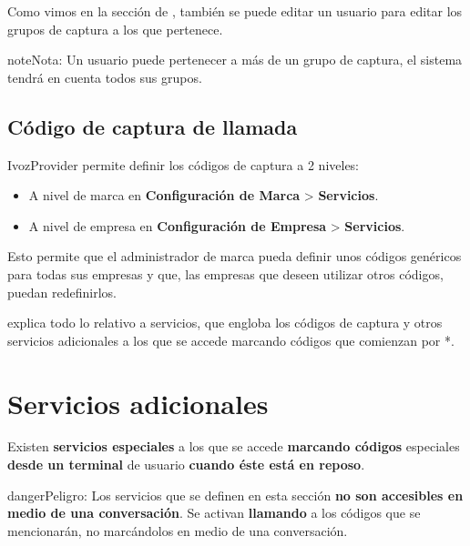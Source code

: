 \documentclass[letterpaper,10pt,spanish]{sphinxmanual}
\begin{document}
\noindent{}

Como vimos en la sección de {\hyperref[pbx_features/users:users]{}}, también se puede editar un usuario para editar los grupos de captura a los que pertenece.

\begin{notice}{note}{Nota:}
Un usuario puede pertenecer a más de un grupo de captura, el sistema tendrá en cuenta todos sus grupos.
\end{notice}


\subsection{Código de captura de llamada}
\label{pbx_features/call_captures:group-pickup-service-code}
IvozProvider permite definir los códigos de captura a 2 niveles:
\begin{itemize}
\item {} 
A nivel de marca en \textbf{Configuración de Marca} \textgreater{} \textbf{Servicios}.

\item {} 
A nivel de empresa en \textbf{Configuración de Empresa} \textgreater{} \textbf{Servicios}.

\end{itemize}

Esto permite que el administrador de marca pueda definir unos códigos genéricos para todas sus empresas y que, las empresas que deseen utilizar otros códigos, puedan redefinirlos.

{\hyperref[pbx_features/services:services]{}} explica todo lo relativo a servicios, que engloba los códigos de captura y otros servicios adicionales a los que se accede marcando códigos que comienzan por *.


\section{Servicios adicionales}
\label{pbx_features/services:services}\label{pbx_features/services:additional-services}\label{pbx_features/services::doc}
Existen \textbf{servicios especiales} a los que se accede \textbf{marcando códigos} especiales \textbf{desde un terminal} de usuario \textbf{cuando éste está en reposo}.

\begin{notice}{danger}{Peligro:}
Los servicios que se definen en esta sección \textbf{no son accesibles en medio de una conversación}. Se activan \textbf{llamando} a los códigos que se mencionarán, no marcándolos en medio de una conversación.
\end{notice}
\end{document}
